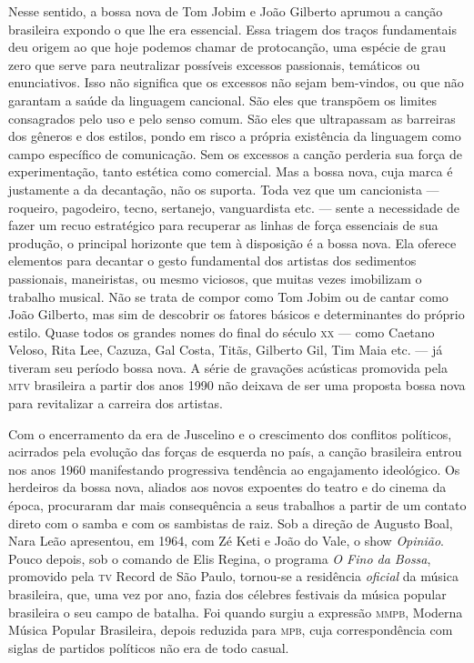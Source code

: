 Nesse sentido, a bossa nova de Tom Jobim e João Gilberto aprumou a
canção brasileira expondo o que lhe era essencial. Essa triagem dos
traços fundamentais deu origem ao que hoje podemos chamar de
protocanção, uma espécie de grau zero que serve para neutralizar
possíveis excessos passionais, temáticos ou enunciativos. Isso não
significa que os excessos não sejam bem-vindos, ou que não garantam a
saúde da linguagem cancional. São eles que transpõem os limites
consagrados pelo uso e pelo senso comum. São eles que ultrapassam as
barreiras dos gêneros e dos estilos, pondo em risco a própria existência
da linguagem como campo específico de comunicação. Sem os excessos a
canção perderia sua força de experimentação, tanto estética como
comercial. Mas a bossa nova, cuja marca é justamente a da decantação,
não os suporta. Toda vez que um cancionista --- roqueiro, pagodeiro,
tecno, sertanejo, vanguardista etc. --- sente a necessidade de fazer um
recuo estratégico para recuperar as linhas de força essenciais de sua
produção, o principal horizonte que tem à disposição é a bossa nova. Ela
oferece elementos para decantar o gesto fundamental dos artistas dos
sedimentos passionais, maneiristas, ou mesmo viciosos, que muitas vezes
imobilizam o trabalho musical. Não se trata de compor como Tom Jobim ou
de cantar como João Gilberto, mas sim de descobrir os fatores básicos e
determinantes do próprio estilo. Quase todos os grandes nomes do final
do século \textsc{xx} --- como Caetano Veloso, Rita Lee, Cazuza, Gal Costa,
Titãs, Gilberto Gil, Tim Maia etc. --- já tiveram seu período
bossa nova. A série de gravações acústicas promovida pela \textsc{mtv}
brasileira a partir dos anos 1990 não deixava de ser uma proposta
bossa nova para revitalizar a carreira dos artistas.

Com o encerramento da era de Juscelino e o crescimento dos conflitos
políticos, acirrados pela evolução das forças de esquerda no país, a
canção brasileira entrou nos anos 1960 manifestando progressiva
tendência ao engajamento ideológico. Os herdeiros da bossa nova, aliados
aos novos expoentes do teatro e do cinema da época, procuraram dar mais
consequência a seus trabalhos a partir de um contato direto com o samba
e com os sambistas de raiz. Sob a direção de Augusto Boal, Nara Leão
apresentou, em 1964, com Zé Keti e João do Vale, o show \textit{Opinião}. Pouco
depois, sob o comando de Elis Regina, o programa \textit{O Fino da Bossa},
promovido pela \textsc{tv} Record de São Paulo, tornou-se a residência
\textit{oficial} da música brasileira, que, uma vez por ano, fazia dos
célebres festivais da música popular brasileira o seu campo de batalha.
Foi quando surgiu a expressão \textsc{mmpb}, Moderna Música Popular Brasileira,
depois reduzida para \textsc{mpb}, cuja correspondência com siglas de partidos
políticos não era de todo casual.

